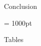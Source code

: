 \documentclass[12pt]{article}
\begin{document}
 \begin{section}{Conclusion}
 
     
 
 \end{section}
 
 \clearpage
 \hfuzz = 1000pt
 \printbibliography
 
 \appendix
 \begin{section}{Tables}
     \label{Append:A}
    \clearpage
    \thispagestyle{empty}
     
    \clearpage
 \end{section}
 
\end{document}
